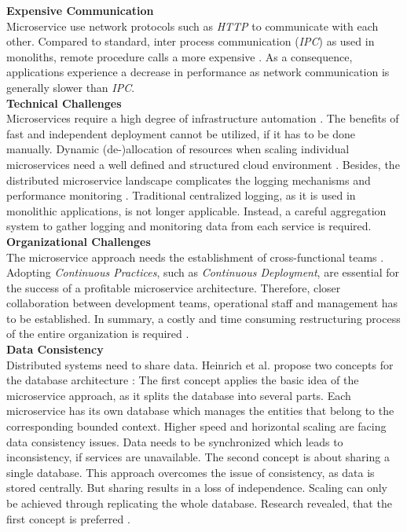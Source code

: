 \noindent
\textbf{Expensive Communication}\\
Microservice use network protocols such as \textit{HTTP} to communicate with each other. Compared to standard, inter process communication (\textit{IPC}) as used in monoliths, remote procedure calls a more expensive \cite{SystematicMappingStudyMicroservice}. As a consequence, applications experience a decrease in performance as network communication is generally slower than \textit{IPC}.\\

\noindent
\textbf{Technical Challenges}\\
Microservices require a high degree of infrastructure automation \cite{MigratingTowardsSurvey}. The benefits of fast and independent deployment cannot be utilized, if it has to be done manually. Dynamic (de-)allocation of resources when scaling individual microservices need a well defined and structured cloud environment \cite{MigratingCloud}. 
Besides, the distributed microservice landscape complicates the logging mechanisms and performance monitoring \cite{SystematicMappingStudyMicroservice}. Traditional centralized logging, as it is used in monolithic applications, is not longer applicable. Instead, a careful aggregation system to gather logging and monitoring data from each service is required.\\

\noindent
\textbf{Organizational Challenges}\\
The microservice approach needs the establishment of cross-functional teams \cite{Fowler}. Adopting \textit{Continuous Practices}, such as \textit{Continuous Deployment}, are essential for the success of a profitable microservice architecture. Therefore, closer collaboration between development teams, operational staff and management has to be established. In summary, a costly and time consuming restructuring process of the entire organization is required \cite{NikoProseminar}. \\



\noindent
\textbf{Data Consistency}\\
Distributed systems need to share data. Heinrich et al. propose two concepts for the database architecture \cite{FunctionalDecompositionHeinrich}: The first concept applies the basic idea of the microservice approach, as it splits the database into several parts. Each microservice has its own database which manages the entities that belong to the corresponding bounded context. Higher speed and horizontal scaling are facing data consistency issues. Data needs to be synchronized which leads to inconsistency, if services are unavailable. The second concept is about sharing a single database. This approach overcomes the issue of consistency, as data is stored centrally. But sharing results in a loss of independence. Scaling can only be achieved through replicating the whole database. Research revealed, that the first concept is preferred \cite{FunctionalDecompositionHeinrich}. \\



